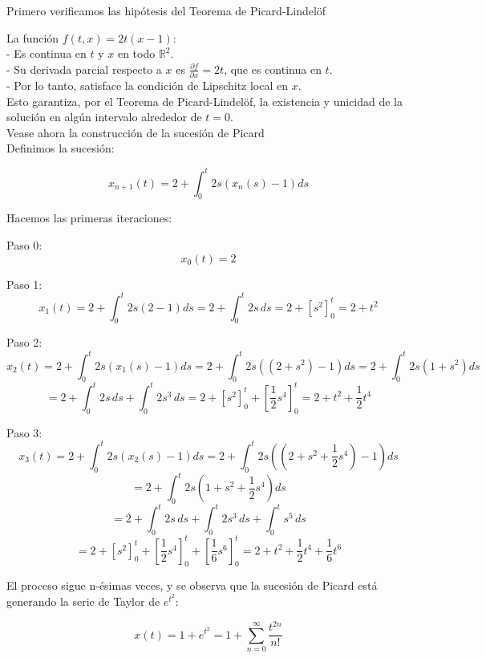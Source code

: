 \documentclass{article}
\theoremstyle{nonumberplain}
\begin{document}
 Primero verificamos las hipótesis del Teorema de Picard-Lindelöf

La función \(f(t, x) = 2t(x-1)\):\\

- Es continua en \(t\) y \(x\) en todo \(\mathbb{R}^2\).\\
- Su derivada parcial respecto a \(x\) es \(\frac{\partial f}{\partial x} = 2t\), que es continua en \(t\).\\
- Por lo tanto, satisface la condición de Lipschitz local en \(x\).\\

Esto garantiza, por el Teorema de Picard-Lindelöf, la existencia y unicidad de la solución en algún intervalo alrededor de \(t=0\).\\

Vease ahora la construcción de la sucesión de Picard\\

Definimos la sucesión:

\[
x_{n+1}(t) = 2 + \int_{0}^{t} 2s(x_n(s)-1) ds
\]

Hacemos las primeras iteraciones:

Paso 0:
\[
x_0(t) = 2
\]

Paso 1:
\[
x_1(t) = 2 + \int_{0}^{t} 2s(2-1) ds = 2 + \int_{0}^{t} 2s\, ds = 2 + [s^2]_0^t = 2 + t^2
\]

Paso 2:
\[
x_2(t) = 2 + \int_{0}^{t} 2s(x_1(s)-1) ds = 2 + \int_{0}^{t} 2s((2 + s^2) - 1) ds = 2 + \int_{0}^{t} 2s(1 + s^2) ds
\]
\[
= 2 + \int_{0}^{t} 2s\, ds + \int_{0}^{t} 2s^3\, ds = 2 + [s^2]_0^t + [\frac{1}{2}s^4]_0^t = 2 + t^2 + \frac{1}{2}t^4
\]

Paso 3:
\[
x_3(t) = 2 + \int_{0}^{t} 2s(x_2(s)-1) ds = 2 + \int_{0}^{t} 2s((2 + s^2 + \frac{1}{2}s^4) - 1) ds
\]
\[
= 2 + \int_{0}^{t} 2s(1 + s^2 + \frac{1}{2}s^4) ds
\]
\[
= 2 + \int_{0}^{t} 2s\, ds + \int_{0}^{t} 2s^3\, ds + \int_{0}^{t} s^5\, ds
\]
\[
= 2 + [s^2]_0^t + [\frac{1}{2}s^4]_0^t + [\frac{1}{6}s^6]_0^t = 2 + t^2 + \frac{1}{2}t^4 + \frac{1}{6}t^6
\]

El proceso sigue n-ésimas veces, y se observa que la sucesión de Picard está generando la serie de Taylor de \(e^{t^2}\):

\[
x(t) = 1 + e^{t^2} = 1 + \sum_{n=0}^{\infty} \frac{t^{2n}}{n!}
\]
\end{document}
